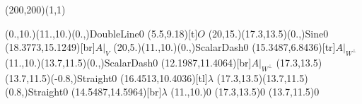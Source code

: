 \unitlength=1bp%

\begin{feynartspicture}(200,200)(1,1)

\FADiagram{}
\FAProp(0.,10.)(11.,10.)(0.,){DoubleLine}{0}
\FALabel(5.5,9.18)[t]{$O$}
\FAProp(20,15.)(17.3,13.5)(0.,){Sine}{0}
\FALabel(18.3773,15.1249)[br]{$A|_V$}
\FAProp(20,5.)(11.,10.)(0.,){ScalarDash}{0}
\FALabel(15.3487,6.8436)[tr]{$A|_{W^\perp}$}
\FAProp(11.,10.)(13.7,11.5)(0.,){ScalarDash}{0}
\FALabel(12.1987,11.4064)[br]{$A|_{W^\perp}$}
\FAProp(17.3,13.5)(13.7,11.5)(-0.8,){Straight}{0}
\FALabel(16.4513,10.4036)[tl]{$\lambda$}
\FAProp(17.3,13.5)(13.7,11.5)(0.8,){Straight}{0}
\FALabel(14.5487,14.5964)[br]{$\lambda$}
\FAVert(11.,10.){0}
\FAVert(17.3,13.5){0}
\FAVert(13.7,11.5){0}
\end{feynartspicture}

